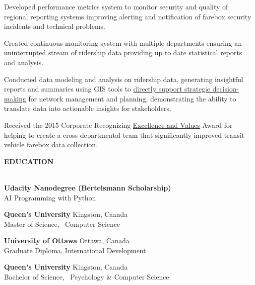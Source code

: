 \documentclass[letterpaper]{article}
\newcommand{\lineunder} {
        \vspace*{-8pt} \\
        \hspace*{-18pt} \hrulefill \\
    }
\newcommand{\header} [1] {
        \vspace{9pt}
        {\hspace*{-18pt}\vspace*{6pt} \large \textbf {#1}}
        \vspace*{-6pt} \lineunder
        \vspace{2pt}
    }
\newenvironment{jobtasklist}
        {
            \vspace{-12pt}
            \begin{itemize} \itemsep 0pt
        }{
            \end{itemize}
            \vspace{-3pt}
        }
\newcommand{\university}[3]{
        \textbf{#1}  %
        \hfill #2\\  %
        #3\\         %
        \vspace{2mm}
    }
\newcommand{\impt}[1]{\uline{#1}}
\begin{document}
\begin{jobtasklist}
{        \item Developed performance metrics system to monitor security and quality
                of regional reporting systems improving alerting and notification of
                farebox security incidents and technical problems.

        \item Created continuous monitoring system with multiple departments
                ensuring an uninterrupted stream of ridership data
                providing up to date statistical reports and analysis.

        \item Conducted data modeling and analysis on ridership data, generating insightful reports and summaries
                using GIS tools to \impt{directly support strategic decision-making} for network management and planning,
                demonstrating the ability to translate data into actionable insights for stakeholders.

%
        \item Received the 2015 Corporate Recognizing \impt{Excellence and Values} Award
                for helping to create a cross-departmental team that significantly
                improved transit vehicle farebox data collection.
    }


\end{jobtasklist}



\header{EDUCATION}
    \university
        {Udacity Nanodegree (Bertelsmann Scholarship)}
        {}
        {AI Programming with Python}
    \university
        {Queen's University}
        {Kingston, Canada}
        {Master of Science, ~Computer Science}

    \university
        {University of Ottawa}
        {Ottawa, Canada}
        {Graduate Diploma, International Development}

    \university
        {Queen's University}
        {Kingston, Canada}
        {Bachelor of Science, ~Psychology \& Computer Science}
\end{document}
